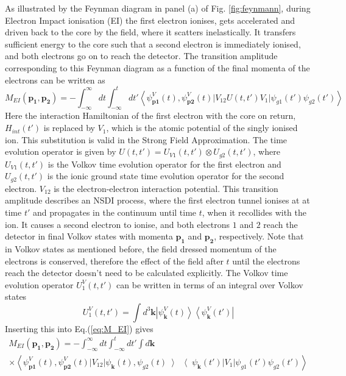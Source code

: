 \documentclass[11pt]{article}
\numberwithin{equation}{section}
\begin{document}
As illustrated by the Feynman diagram in panel (a) of Fig. \ref{fig:feynmann}, during Electron Impact ionisation (EI) the first electron ionises, gets accelerated and driven back to the core by the field, where it scatters inelastically. It transfers sufficient energy to the core such that a second electron is immediately ionised, and both electrons go on to reach the detector. The transition amplitude corresponding to this Feynman diagram as a function of the final momenta of the electrons can be written as
\begin{equation}\label{eq:M_EI}
    M_{EI}(\mathbf{p_1},\mathbf{p_2}) = -\int_{-\infty}^\infty dt \int _{- \infty} ^t dt' \left \langle \psi_{\mathbf{p1}}^V (t), \psi_{\mathbf{p2}}^V (t) \left | V_{12} U(t, t') V_1 \right |\psi_{g1} (t') \psi_{g2}(t') \right \rangle
\end{equation}
\newline
Here the interaction Hamiltonian of the first electron with the core on return, $H_{int}(t')$ is replaced by $V_1$, which is the atomic potential of the singly ionised ion. This substitution is valid in the Strong Field Approximation. The time evolution operator is given by $U(t, t') = U_{V1}(t, t') \otimes U_{g2}(t, t')$, where $U_{V1}(t, t')$ is the Volkov time evolution operator for the first electron and $U_{g2}(t, t')$ is the ionic ground state time evolution operator for the second electron. $V_{12}$ is the electron-electron interaction potential. This transition amplitude describes an NSDI process, where the first electron tunnel ionises at at time $t'$ and propagates in the continuum until time $t$, when it recollides with the ion. It causes a second electron to ionise, and both electrons $1$ and $2$ reach the detector in final Volkov states with momenta $\mathbf{p_1}$ and $\mathbf{p_2}$, respectively. Note that in Volkov states as mentioned before, the field dressed momentum of the electrons is conserved, therefore the effect of the field after $t$ until the electrons reach the detector doesn't need to be calculated explicitly. The Volkov time evolution operator $U_1^V (t,t')$ can be written in terms of an integral over Volkov states
\begin{equation}
    U_1^V (t,t') = \int d^3 \mathbf{k} \left | \psi_{\mathbf{k}}^V (t)\right \rangle \left \langle \psi_{\mathbf{k}}^V (t') \right |
\end{equation}
Inserting this into Eq.(\ref{eq:M_EI}) gives
\begin{multline}
    M_{EI}(\mathbf{p_1},\mathbf{p_2}) = -\int_{-\infty}^\infty dt \int _{- \infty} ^t dt' \int d\mathbf{k}  \\ \times \left \langle \psi_{\mathbf{p1}}^V (t), \psi_{\mathbf{p2}}^V (t) \left | V_{12}\right | \psi_{\mathbf{k}}(t), \psi_{g2}(t) \left \rangle \right \langle  \psi_{\mathbf{k}}(t') \left | V_1\right | \psi_{g1} (t') \psi_{g2}(t') \right \rangle
\end{multline}
\end{document}
